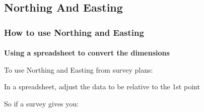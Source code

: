\documentclass[book]{standalone}
\title{}  %
\begin{document}

\ifstandalone
\maketitle %
\tableofcontents %
\clearpage
\fi
\clearpage
\subsection{Northing And Easting}
\medskip
\subsubsection[How to use]{How to use Northing and Easting}
\vspace{.1in}

\paragraph[Use a Spreadsheet]{}\textbf{{\Large Using a spreadsheet to convert the dimensions}}
\vspace{.1in}

%
%
\noindent To use Northing and Easting from survey plans:\\
\vspace{.1in}

\noindent In a spreadsheet, adjust the data to be relative to the 1st point\\
\vspace{.1in}

\noindent So if a survey gives you:\\

\begin{table}[htbp]
\centering
{}
\caption{Survey Plan Northing and Easting}
\end{table}
\clearpage
\end{document}
